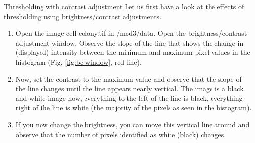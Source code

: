 \begin{taskbox}{Thresholding with contrast adjustment}
Let us first have a look at the effects of thresholding using brightness/contrast adjustments.

\begin{enumerate}
	\item Open the image cell-colony.tif in /mod3/data. Open the brightness/contrast adjustment window. Observe the slope of the line that shows the change in (displayed) intensity between the minimum and maximum pixel values in the histogram (Fig. \ref{fig:bc-window}, red line).
	
	\begin{minipage}[t]{\linewidth}
		\begin{center}
		\medskip
		\label{fig:bc-window}
		\end{center}
	\end{minipage}
	
	\item Now, set the contrast to the maximum value and observe that the slope of the line changes until the line appears nearly vertical. The image is a black and white image now, everything to the left of the line is black, everything right of the line is white (the majority of the pixels as seen in the histogram).
	\item If you now change the brightness, you can move this vertical line around and observe that the number of pixels identified as white (black) changes.
	\end{enumerate}
\end{taskbox}

